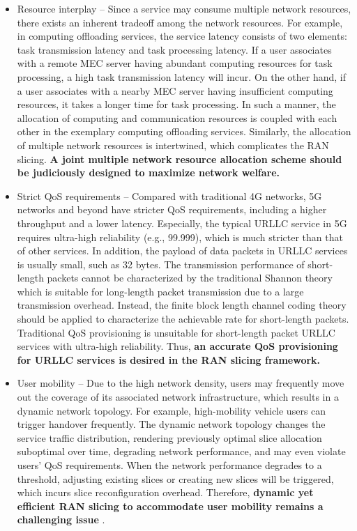 \documentclass[conference]{IEEEtran}
\begin{document}
\begin{itemize}
\item 
Resource interplay – Since a service may consume multiple network resources, there exists an inherent tradeoff
among the network resources. For example, in computing offloading services, the service latency consists of
two elements: task transmission latency and task processing latency. If a user associates with a remote MEC
server having abundant computing resources for task
processing, a high task transmission latency will incur.
On the other hand, if a user associates with a nearby
MEC server having insufficient computing resources, it
takes a longer time for task processing. In such a manner, the allocation of computing and communication resources is coupled with each other in the exemplary computing offloading services. Similarly, the allocation of
multiple network resources is intertwined, which complicates the RAN slicing. \textbf{A joint multiple network resource allocation scheme should be judiciously designed
to maximize network welfare.}
\item  Strict QoS requirements – Compared with traditional 4G
networks, 5G networks and beyond have stricter QoS
requirements, including a higher throughput and a lower
latency. Especially, the typical URLLC service in 5G
requires ultra-high reliability (e.g., 99.999), which is
much stricter than that of other services. In addition, the
payload of data packets in URLLC services is usually
small, such as 32 bytes. The transmission performance of short-length packets cannot be characterized
by the traditional Shannon theory which is suitable for
long-length packet transmission due to a large transmission overhead. Instead, the finite block length channel coding theory should be applied to characterize the
achievable rate for short-length packets. Traditional
QoS provisioning is unsuitable for short-length packet
URLLC services with ultra-high reliability. Thus, \textbf{an accurate QoS provisioning for URLLC services is desired
in the RAN slicing framework.}
\item  User mobility – Due to the high network density, users
may frequently move out the coverage of its associated network infrastructure, which results in a dynamic
network topology. For example, high-mobility vehicle
users can trigger handover frequently. The dynamic network topology changes the service traffic distribution,
rendering previously optimal slice allocation suboptimal
over time, degrading network performance, and may
even violate users’ QoS requirements. When the network
performance degrades to a threshold, adjusting existing
slices or creating new slices will be triggered, which
incurs slice reconfiguration overhead. Therefore, \textbf{dynamic yet
efficient RAN slicing to accommodate user mobility remains a challenging issue} \cite{aiNS}.
\end{itemize}
\end{document}
